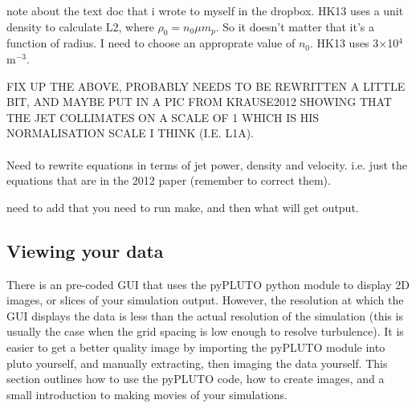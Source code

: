 \documentclass[12pt]{article}
\begin{document}
note about the text doc that i wrote to myself in the dropbox. HK13 uses a unit density to calculate L2, where $\rho_0 = n_0\mu m_p$. So it doesn't matter that it's a function of radius. I need to choose an approprate value of $n_0$. HK13 uses 3$\times$10$^4$m$^{-3}$.

FIX UP THE ABOVE, PROBABLY NEEDS TO BE REWRITTEN A LITTLE BIT, AND MAYBE PUT IN A PIC FROM KRAUSE2012 SHOWING THAT THE JET COLLIMATES ON A SCALE OF 1 WHICH IS HIS NORMALISATION SCALE I THINK (I.E. L1A).\\
\\
Need to rewrite equations in terms of jet power, density and velocity. i.e. just the equations that are in the 2012 paper (remember to correct them).

need to add that you need to run make, and then what will get output.
\subsection{Viewing your data}
There is an pre-coded GUI that uses the pyPLUTO python module to display 2D images, or slices of your simulation output. However, the resolution at which the GUI displays the data is less than the actual resolution of the simulation (this is usually the case when the grid spacing is low enough to resolve turbulence). It is easier to get a better quality image by importing the pyPLUTO module into pluto yourself, and manually extracting, then imaging the data yourself. This section outlines how to use the pyPLUTO code, how to create images, and a small introduction to making movies of your simulations.
\end{document}
